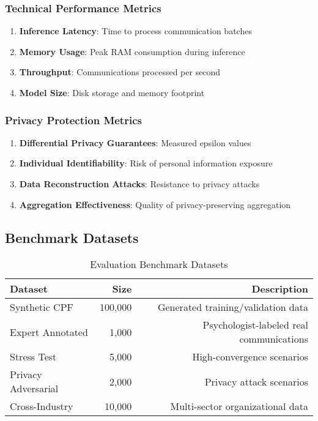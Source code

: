 \documentclass[11pt,a4paper]{article}
\begin{document}
\subsubsection{Technical Performance Metrics}

\begin{enumerate}
\item \textbf{Inference Latency}: Time to process communication batches
\item \textbf{Memory Usage}: Peak RAM consumption during inference
\item \textbf{Throughput}: Communications processed per second
\item \textbf{Model Size}: Disk storage and memory footprint
\end{enumerate}

\subsubsection{Privacy Protection Metrics}

\begin{enumerate}
\item \textbf{Differential Privacy Guarantees}: Measured epsilon values
\item \textbf{Individual Identifiability}: Risk of personal information exposure
\item \textbf{Data Reconstruction Attacks}: Resistance to privacy attacks
\item \textbf{Aggregation Effectiveness}: Quality of privacy-preserving aggregation
\end{enumerate}

\subsection{Benchmark Datasets}

\begin{table}[h!]
\centering
\caption{Evaluation Benchmark Datasets}
\label{tab:benchmarks}
\begin{tabular}{lrr}
\toprule
Dataset & Size & Description \\
\midrule
Synthetic CPF & 100,000 & Generated training/validation data \\
Expert Annotated & 1,000 & Psychologist-labeled real communications \\
Stress Test & 5,000 & High-convergence scenarios \\
Privacy Adversarial & 2,000 & Privacy attack scenarios \\
Cross-Industry & 10,000 & Multi-sector organizational data \\
\bottomrule
\end{tabular}
\end{table}
\end{document}
